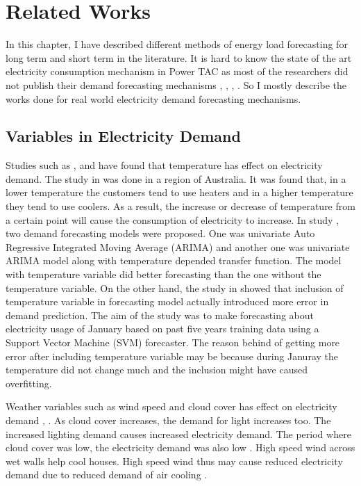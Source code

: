 
\chapter{Related Works}

In this chapter, I have described different methods of energy load forecasting for long term and short term in the literature. It is hard to know the state of the art electricity consumption mechanism in Power TAC as most of the researchers did not publish their demand forecasting mechanisms \cite{liefers2014successful}, \cite{ozdemir2015winner}, \cite{serranofixing}, \cite{ozdemir2015agentude}. So I mostly describe the works done for real world electricity demand forecasting mechanisms.   

\section{Variables in Electricity Demand}

Studies such as \cite{hor2005analyzing}, \cite{hart2004weather} and \cite{cho1995customer} have found that temperature has effect on electricity demand. The study in \cite{hart2004weather} was done in a region of Australia.  It was found that,  in a lower temperature the customers tend to use heaters and in a higher temperature they tend to use coolers. As a result, the increase or decrease of temperature from a certain point will cause the consumption of electricity to increase. In study \cite{cho1995customer}, two demand forecasting models were proposed. One was univariate Auto Regressive Integrated Moving Average (ARIMA) and another one was univariate ARIMA model along with temperature depended transfer function. The model with temperature variable did better forecasting than the one without the temperature variable. On the other hand, the study in  \cite{chen2004load} showed that inclusion of temperature variable in forecasting model actually introduced more error in demand prediction. The aim of the study was to make forecasting about electricity usage of January based on past five years training data using a Support Vector Machine (SVM)  forecaster. The reason behind of getting more error after including temperature variable may be because during Januray the temperature did not change much and the inclusion might have caused overfitting. 

Weather variables such as  wind speed and cloud cover has effect on electricity demand \cite{hor2005analyzing}, \cite{rudenauer2004energy}. As cloud cover increases, the demand for light increases too. The increased lighting demand causes increased electricity demand. The period where cloud cover was low, the electricity demand was also low \cite{hor2005analyzing}. High speed wind across wet walls help cool houses. High speed wind thus may cause reduced electricity demand due to reduced demand of air cooling \cite{rudenauer2004energy}. 



